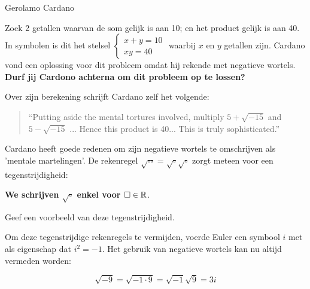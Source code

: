 \documentclass{ximera}
\begin{document}
\begin{exercise}{Gerolamo Cardano}

    Zoek 2 getallen waarvan de som gelijk is aan 10; en het product gelijk is aan 40.
    In symbolen is dit het stelsel \( 
        \begin{cases}
            x + y = 10 \\
            xy = 40
        \end{cases} \)
    waarbij \(x\) en \(y\) getallen zijn. \newline
    Cardano vond een oplossing voor dit probleem omdat hij rekende met negatieve wortels. \newline
    \textbf{Durf jij Cardono achterna om dit probleem op te lossen?}
\end{exercise}


Over zijn berekening schrijft Cardano zelf het volgende: 

\begin{quote}
    “Putting aside the mental tortures involved, 
    multiply \(5 + \sqrt{-15}\) and \(5 - \sqrt{-15}\) ... 
    Hence this product is 40... 
    This is truly sophisticated.”
\end{quote}




\begin{remark}
    Cardano heeft goede redenen om zijn negatieve wortels te omschrijven als 'mentale martelingen'.
    De rekenregel \(\sqrt{\square \square} = \sqrt{\square}\sqrt{\square}\) zorgt meteen voor een tegenstrijdigheid: 
    \begin{center} 
        \textbf{We schrijven \(\sqrt{\square}\) enkel voor \( \square \in \mathbb{R} \)}. 
    \end{center}
\end{remark}


 
\begin{quickquestion*}{}
	Geef een voorbeeld van deze tegenstrijdigheid. 
\end{quickquestion*}


Om deze tegenstrijdige rekenregels te vermijden, voerde Euler een symbool \(i\) met als eigenschap dat \textbf{\(i^2 = -1\)}.
Het gebruik van negatieve wortels kan nu altijd vermeden worden: 

\[ \sqrt{-9} = \sqrt{-1 \cdot 9} = \sqrt{-1} \sqrt{9} = 3i  \]
\end{document}
